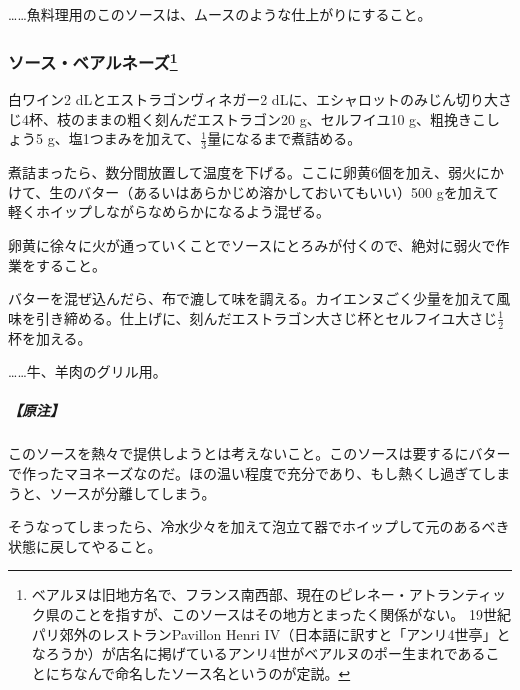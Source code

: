 \begin{recette}
\ldots{}\ldots{}魚料理用のこのソースは、ムースのような仕上がりにすること。

\atoaki{}

\hypertarget{sauce-bearnaise}{%
\subsubsection[ソース・ベアルネーズ]{\texorpdfstring{ソース・ベアルネーズ\footnote{ベアルヌは旧地方名で、フランス南西部、現在のピレネー・アトランティック県のことを指すが、このソースはその地方とまったく関係がない。
  19世紀パリ郊外のレストランPavillon Henri
  IV（日本語に訳すと「アンリ4世亭」となろうか）が店名に掲げているアンリ4世がベアルヌのポー生まれであることにちなんで命名したソース名というのが定説。}}{ソース・ベアルネーズ}}\label{sauce-bearnaise}}


 

白ワイン2 dLとエストラゴンヴィネガー2
dLに、エシャロットのみじん切り大さじ4杯、枝のままの粗く刻んだエストラゴン20
g、セルフイユ10 g、粗挽きこしょう5
g、塩1つまみを加えて、\(\frac{1}{3}\)量になるまで煮詰める。

煮詰まったら、数分間放置して温度を下げる。ここに卵黄6個を加え、弱火にかけて、生のバター（あるいはあらかじめ溶かしておいてもいい）500
gを加えて軽くホイップしながらなめらかになるよう混ぜる。

卵黄に徐々に火が通っていくことでソースにとろみが付くので、絶対に弱火で作業をすること。

バターを混ぜ込んだら、布で漉して味を調える。カイエンヌごく少量を加えて風味を引き締める。仕上げに、刻んだエストラゴン大さじ杯とセルフイユ大さじ\(\frac{1}{2}\)杯を加える。

\ldots{}\ldots{}牛、羊肉のグリル用。

\hypertarget{nota-sauce-bearnaise}{%
\subparagraph{【原注】}\label{nota-sauce-bearnaise}}

このソースを熱々で提供しようとは考えないこと。このソースは要するにバターで作ったマヨネーズなのだ。ほの温い程度で充分であり、もし熱くし過ぎてしまうと、ソースが分離してしまう。

そうなってしまったら、冷水少々を加えて泡立て器でホイップして元のあるべき状態に戻してやること。


\end{recette}
